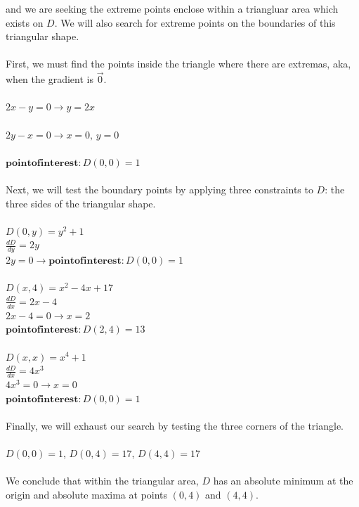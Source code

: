 \documentclass[12pt]{article}
\begin{document}
\noindent and we are seeking the extreme points enclose within a triangluar area which exists on $D$. We will also search 
for extreme points on the boundaries of this triangular shape. \\\\
\noindent First, we must find the points inside the triangle where there are extremas, aka, when the gradient is $\vec{0}$.\\\\
\noindent $2x - y = 0 \rightarrow y = 2x$\\\\
\noindent $2y - x = 0 \rightarrow x = 0\text{, } y = 0$\\\\
\noindent $\mathbf{point of interest: }D(0,0) = 1$\\\\
\noindent Next, we will test the boundary points by applying three constraints to $D$: the three sides of the triangular shape.\\\\
\noindent $D(0, y) = y^{2} + 1$\\
\noindent $\frac{dD}{dy} = 2y$\\
\noindent $2y = 0 \rightarrow \mathbf{point of interest: } D(0, 0) = 1$\\\\
\noindent $D(x, 4) = x^{2}-4x+17$\\
\noindent $\frac{dD}{dx} =2x -4$\\
\noindent $2x -4 = 0 \rightarrow x = 2$\\
\noindent $\mathbf{point of interest: } D(2, 4) = 13$\\\\
\noindent $D(x, x) = x^{4}+1$\\
\noindent $\frac{dD}{dx} =4x^{3}$\\
\noindent $4x^{3} = 0 \rightarrow x = 0$\\
\noindent $\mathbf{point of interest: } D(0, 0) = 1$\\\\
\noindent Finally, we will exhaust our search by testing the three corners of the triangle.\\\\
\noindent $D(0,0) = 1$, \hspace{10pt} $D(0,4) = 17$, \hspace{10pt} $D(4, 4) = 17$\\\\
\noindent We conclude that within the triangular area, $D$ has an absolute minimum at the origin and absolute maxima at points $(0,4)$ and $(4,4)$.\\\\
\end{document}
